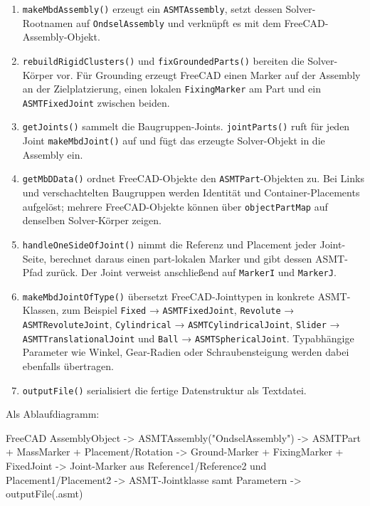 \documentclass[
  12pt
]{book}
\newenvironment{Shaded}{}{}
\newcommand{\NormalTok}[1]{#1}
\providecommand{\tightlist}{%
  \setlength{\itemsep}{0pt}\setlength{\parskip}{0pt}}
\begin{document}
\begin{enumerate}
\def\labelenumi{\arabic{enumi}.}
\tightlist
\item
  \texttt{makeMbdAssembly()} erzeugt ein \texttt{ASMTAssembly}, setzt
  dessen Solver-Rootnamen auf \texttt{OndselAssembly} und verknüpft es
  mit dem FreeCAD-Assembly-Objekt.
\item
  \texttt{rebuildRigidClusters()} und \texttt{fixGroundedParts()}
  bereiten die Solver-Körper vor. Für Grounding erzeugt FreeCAD einen
  Marker auf der Assembly an der Zielplatzierung, einen lokalen
  \texttt{FixingMarker} am Part und ein \texttt{ASMTFixedJoint} zwischen
  beiden.
\item
  \texttt{getJoints()} sammelt die Baugruppen-Joints.
  \texttt{jointParts()} ruft für jeden Joint \texttt{makeMbdJoint()} auf
  und fügt das erzeugte Solver-Objekt in die Assembly ein.
\item
  \texttt{getMbDData()} ordnet FreeCAD-Objekte den
  \texttt{ASMTPart}-Objekten zu. Bei Links und verschachtelten
  Baugruppen werden Identität und Container-Placements aufgelöst;
  mehrere FreeCAD-Objekte können über \texttt{objectPartMap} auf
  denselben Solver-Körper zeigen.
\item
  \texttt{handleOneSideOfJoint()} nimmt die Referenz und Placement jeder
  Joint-Seite, berechnet daraus einen part-lokalen Marker und gibt
  dessen ASMT-Pfad zurück. Der Joint verweist anschließend auf
  \texttt{MarkerI} und \texttt{MarkerJ}.
\item
  \texttt{makeMbdJointOfType()} übersetzt FreeCAD-Jointtypen in konkrete
  ASMT-Klassen, zum Beispiel \texttt{Fixed} → \texttt{ASMTFixedJoint},
  \texttt{Revolute} → \texttt{ASMTRevoluteJoint}, \texttt{Cylindrical} →
  \texttt{ASMTCylindricalJoint}, \texttt{Slider} →
  \texttt{ASMTTranslationalJoint} und \texttt{Ball} →
  \texttt{ASMTSphericalJoint}. Typabhängige Parameter wie Winkel,
  Gear-Radien oder Schraubensteigung werden dabei ebenfalls übertragen.
\item
  \texttt{outputFile()} serialisiert die fertige Datenstruktur als
  Textdatei.
\end{enumerate}

Als Ablaufdiagramm:

\begin{Shaded}
\begin{Highlighting}[]
\NormalTok{FreeCAD AssemblyObject}
\NormalTok{    {-}\textgreater{} ASMTAssembly("OndselAssembly")}
\NormalTok{    {-}\textgreater{} ASMTPart + MassMarker + Placement/Rotation}
\NormalTok{    {-}\textgreater{} Ground{-}Marker + FixingMarker + FixedJoint}
\NormalTok{    {-}\textgreater{} Joint{-}Marker aus Reference1/Reference2 und Placement1/Placement2}
\NormalTok{    {-}\textgreater{} ASMT{-}Jointklasse samt Parametern}
\NormalTok{    {-}\textgreater{} outputFile(.asmt)}
\end{Highlighting}
\end{Shaded}
\end{document}
